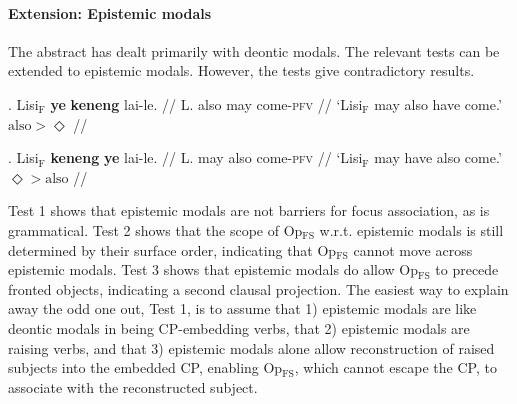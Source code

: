 \documentclass[11pt]{article}
\let\latextextsubscript\textsubscript
\let\textsubscript\latextextsubscript
\newcommand{\gap}[1]{\rule{1em}{0.4pt}\textsubscript{#1}}
\newcommand{\F}{\ensuremath{_{\mathrm{F}}}}
\newcommand{\opfs}{Op\(_{\mathrm{FS}}\)}
\begin{document}
%
%
%
%
%
\paragraph{Extension: Epistemic modals}
\label{par:extension_epistemic_modals}

The abstract has dealt primarily with deontic modals.
The relevant tests can be extended to epistemic modals.
However, the tests give contradictory results.
\begin{paracol}{2}
  \ex. 
  \begingl
  \gla Lisi\F{} \textbf{ye} \textbf{keneng} lai-le. //
  \glb L. also may come-\textsc{pfv} //
  \glft `Lisi\F{} may also have come.' \hfill \(\text{also} > \Diamond\) //
  \endgl

  \switchcolumn
  \ex. \begingl
  \gla Lisi\F{} \textbf{keneng} \textbf{ye} lai-le. //
  \glb L. may also come-\textsc{pfv} //
  \glft `Lisi\F{} may have also come.'\hfill \(\Diamond > \text{also}\) //
  \endgl

\end{paracol}


Test 1 shows that epistemic modals are not barriers for focus association, as \Last is grammatical.
Test 2 shows that the scope of \opfs{} w.r.t. epistemic modals is still determined by their surface order, indicating that \opfs{} cannot move across epistemic modals.
Test 3 shows that epistemic modals do allow \opfs{} to precede fronted objects, indicating a second clausal projection.
The easiest way to explain away the odd one out, Test 1, is to assume that 1) epistemic modals are like deontic modals in being CP-embedding verbs, that 2) epistemic modals are raising verbs, and that 3) epistemic modals alone allow reconstruction of raised subjects into the embedded CP, enabling \opfs{}, which cannot escape the CP, to associate with the reconstructed subject.
\end{document}
